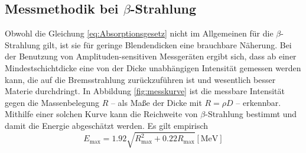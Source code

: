 \subsection{Messmethodik bei \texorpdfstring{$\beta$}{Beta}-Strahlung}
Obwohl die Gleichung \eqref{eq:Absorptionsgesetz} nicht im Allgemeinen für die $\beta$-Strahlung gilt, ist sie für geringe Blendendicken eine brauchbare Näherung.
Bei der Benutzung von Amplituden-sensitiven Messgeräten ergibt sich, dass ab einer Mindestschichtdicke eine von der Dicke unabhängigen Intensität gemessen werden kann, die auf die Bremsstrahlung zurückzuführen ist und wesentlich besser Materie durchdringt.
In Abbildung \ref{fig:messkurve} ist die messbare Intensität gegen die Massenbelegung $R$ -- als Maße der Dicke mit $R=\rho D$ -- erkennbar.
Mithilfe einer solchen Kurve kann die Reichweite von $\beta$-Strahlung bestimmt und damit die Energie abgeschätzt werden.
Es gilt empirisch
\begin{equation}
	E_\text{max}=1.92\sqrt{R_\text{max}^2+0.22R_\text{max}} [ \si{\mega\electronvolt}]
\end{equation}